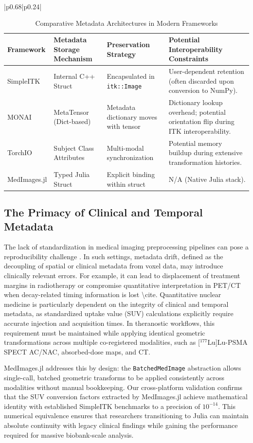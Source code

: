 \documentclass[10pt,letterpaper]{article}
\begin{document}
\begin{table}[H]
\begin{tabular}{|p{}|p{}|}
\begin{table}[H]
\centering
\caption{Comparative Metadata Architectures in Modern Frameworks}
\begin{tabular}{|p{2.5cm}|p{3.5cm}|p{3.5cm}|p{3.5cm}|}
\hline
\textbf{Framework} & \textbf{Metadata Storage Mechanism} & \textbf{Preservation Strategy} & \textbf{Potential Interoperability Constraints} \\
\hline
SimpleITK & Internal C++ Struct & Encapsulated in \texttt{itk::Image} & User-dependent retention (often discarded upon conversion to NumPy). \\
\hline
MONAI & MetaTensor (Dict-based) & Metadata dictionary moves with tensor & Dictionary lookup overhead; potential orientation flip during ITK interoperability. \\
\hline
TorchIO & Subject Class Attributes & Multi-modal synchronization & Potential memory buildup during extensive transformation histories. \\
\hline
MedImages.jl & Typed Julia Struct & Explicit binding within struct & N/A (Native Julia stack). \\
\hline
\end{tabular}
\label{tab:metadata_comparison}
\end{table}

\subsection*{The Primacy of Clinical and Temporal Metadata}
The lack of standardization in medical imaging preprocessing pipelines can pose a reproducibility challenge \cite{Esteban_2018}. In such settings, metadata drift, defined as the decoupling of spatial or clinical metadata from voxel data, may introduce clinically relevant errors. For example, it can lead to displacement of treatment margins in radiotherapy or compromise quantitative interpretation in PET/CT when decay-related timing information is lost \textbackslash{}cite. Quantitative nuclear medicine is particularly dependent on the integrity of clinical and temporal metadata, as standardized uptake value (SUV) calculations explicitly require accurate injection and acquisition times. In theranostic workflows, this requirement must be maintained while applying identical geometric transformations across multiple co-registered modalities, such as [$^{177}$Lu]Lu-PSMA SPECT AC/NAC, absorbed-dose maps, and CT.

MedImages.jl addresses this by design: the \texttt{BatchedMedImage} abstraction allows single-call, batched geometric transforms to be applied consistently across modalities without manual bookkeeping. Our cross-platform validation confirms that the SUV conversion factors extracted by MedImages.jl achieve mathematical identity with established SimpleITK benchmarks to a precision of $10^{-14}$. This numerical equivalence ensures that researchers transitioning to Julia can maintain absolute continuity with legacy clinical findings while gaining the performance required for massive biobank-scale analysis.


\end{tabular}
\end{table}
\end{document}
